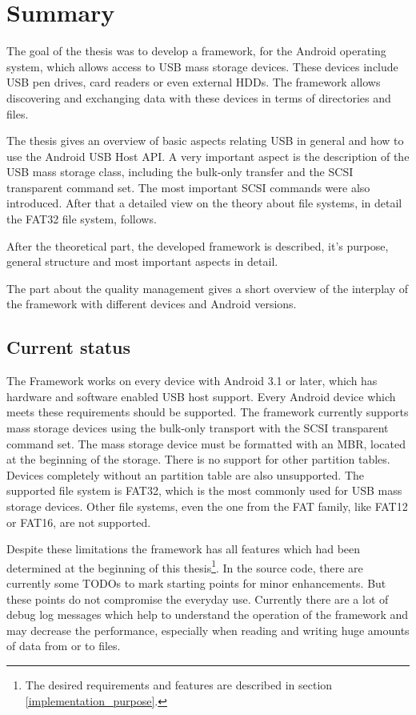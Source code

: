 \chapter{Summary}

The goal of the thesis was to develop a framework, for the Android operating system, which allows access to USB mass storage devices. These devices include USB pen drives, card readers or even external HDDs. The framework allows discovering and exchanging data with these devices in terms of directories and files.

The thesis gives an overview of basic aspects relating USB in general and how to use the Android USB Host API. A very important aspect is the description of the USB mass storage class, including the bulk-only transfer and the SCSI transparent command set. The most important SCSI commands were also introduced. After that a detailed view on the theory about file systems, in detail the FAT32 file system, follows.

After the theoretical part, the developed framework is described, it's purpose, general structure and most important aspects in detail.

The part about the quality management gives a short overview of the interplay of the framework with different devices and Android versions.

\section{Current status}

The Framework works on every device with Android 3.1 or later, which has hardware and software enabled USB host support. Every Android device which meets these requirements should be supported. The framework currently supports mass storage devices using the bulk-only transport with the SCSI transparent command set. The mass storage device must be formatted with an MBR, located at the beginning of the storage. There is no support for other partition tables. Devices completely without an partition table are also unsupported. The supported file system is FAT32, which is the most commonly used for USB mass storage devices. Other file systems, even the one from the FAT family, like FAT12 or FAT16, are not supported.

Despite these limitations the framework has all features which had been determined at the beginning of this thesis\footnote{The desired requirements and features are described in section \ref{implementation_purpose}.}. In the source code, there are currently some TODOs to mark starting points for minor enhancements. But these points do not compromise the everyday use. Currently there are a lot of debug log messages which help to understand the operation of the framework and may decrease the performance, especially when reading and writing huge amounts of data from or to files.

